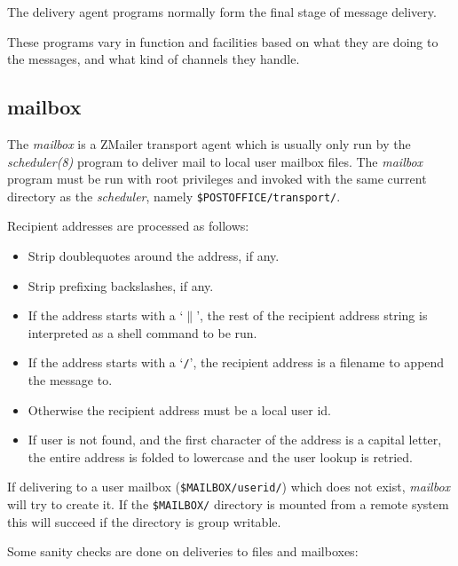
The delivery agent programs normally form the final stage of message delivery.

These programs vary in function and facilities based on what they are
doing to the messages, and what kind of channels they handle.


\subsection{mailbox}

The {\em mailbox} is a ZMailer transport agent which is usually
only run by the {\em scheduler(8)} program to deliver mail to
local user mailbox files. The {\em mailbox} program must be
run with root privileges and invoked with the same current 
directory as the {\em scheduler}, namely 
{\tt \$POSTOFFICE/transport/}.

Recipient addresses are processed  as follows: 

\begin{itemize}
\item Strip doublequotes around the address, if any. 
\item Strip prefixing backslashes, if any.  
\item If the address starts with a `{\tt $\|$}', the rest of the recipient address 
string is interpreted as  a shell command to be run. 
\item If the address starts with a `{\tt /}', the recipient address is a  filename
to append the message to. 
\item Otherwise the recipient address must be a local user id. 
\item If user is not  found,  and the first character of the address is a capital 
letter, the entire address is folded to lowercase and the user lookup is  retried.
\end{itemize}


If delivering to a user mailbox ({\tt \$MAILBOX/userid/}) which
does not exist, {\em mailbox} will try to create it. If the
{\tt \$MAILBOX/} directory is mounted from a remote system this
will succeed if the directory is group writable.

Some sanity checks are done on deliveries to files and mailboxes:

